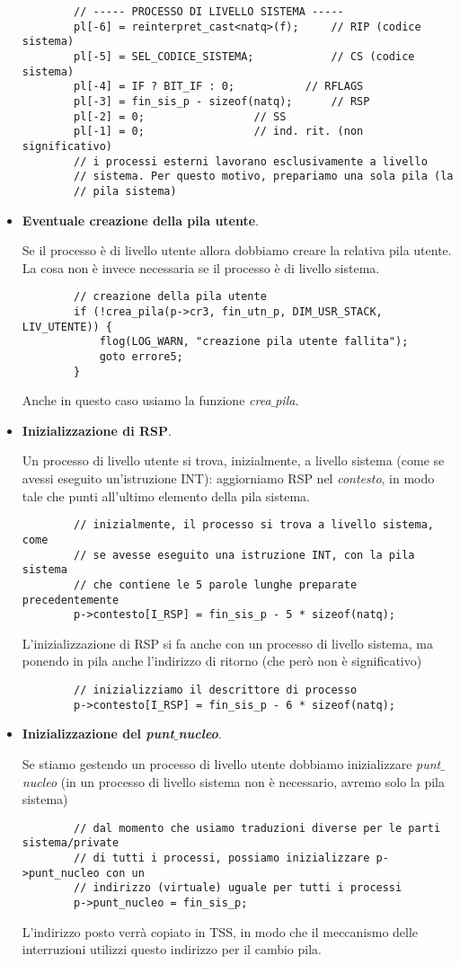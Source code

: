 \begin{itemize}
\begin{verbatim}
		// ----- PROCESSO DI LIVELLO SISTEMA -----
		pl[-6] = reinterpret_cast<natq>(f);  	// RIP (codice sistema)
		pl[-5] = SEL_CODICE_SISTEMA;            // CS (codice sistema)
		pl[-4] = IF ? BIT_IF : 0;  	        // RFLAGS
		pl[-3] = fin_sis_p - sizeof(natq);      // RSP
		pl[-2] = 0;			        // SS
		pl[-1] = 0;			        // ind. rit. (non significativo)
		// i processi esterni lavorano esclusivamente a livello
		// sistema. Per questo motivo, prepariamo una sola pila (la
		// pila sistema)
	\end{verbatim}
	\normalsize 
	
	\item \textbf{Eventuale creazione della pila utente}.
	
	Se il processo è di livello utente allora dobbiamo creare la relativa pila utente. La cosa non è invece necessaria se il processo è di livello sistema. 
	\small
	\begin{verbatim}
		// creazione della pila utente
		if (!crea_pila(p->cr3, fin_utn_p, DIM_USR_STACK, LIV_UTENTE)) {
			flog(LOG_WARN, "creazione pila utente fallita");
			goto errore5;
		}
	\end{verbatim}
	\normalsize 
	Anche in questo caso usiamo la funzione \emph{crea$\_$pila}. 
	\item \textbf{Inizializzazione di RSP}. 
	
	Un processo di livello utente si trova, inizialmente, a livello sistema (come se avessi eseguito un'istruzione INT): aggiorniamo RSP nel \emph{contesto}, in modo tale che punti all'ultimo elemento della pila sistema.
	\small 
	\begin{verbatim}
		// inizialmente, il processo si trova a livello sistema, come
		// se avesse eseguito una istruzione INT, con la pila sistema
		// che contiene le 5 parole lunghe preparate precedentemente
		p->contesto[I_RSP] = fin_sis_p - 5 * sizeof(natq);
	\end{verbatim}
	\normalsize 
	L'inizializzazione di RSP si fa anche con un processo di livello sistema, ma ponendo in pila anche l'indirizzo di ritorno (che però non è significativo)
	\small 
	\begin{verbatim}
		// inizializziamo il descrittore di processo
		p->contesto[I_RSP] = fin_sis_p - 6 * sizeof(natq);
	\end{verbatim}
	\normalsize 
	
	\item \textbf{Inizializzazione del \emph{punt$\_$nucleo}}.
	
	Se stiamo gestendo un processo di livello utente dobbiamo inizializzare \emph{punt$\_$nucleo} (in un processo di livello sistema non è necessario, avremo solo la pila sistema)
	\small
	\begin{verbatim}
		// dal momento che usiamo traduzioni diverse per le parti sistema/private
		// di tutti i processi, possiamo inizializzare p->punt_nucleo con un
		// indirizzo (virtuale) uguale per tutti i processi
		p->punt_nucleo = fin_sis_p;
	\end{verbatim}
	\normalsize  L'indirizzo posto verrà copiato in TSS, in modo che il meccanismo delle interruzioni utilizzi questo indirizzo per il cambio pila. 
	

\end{itemize}
